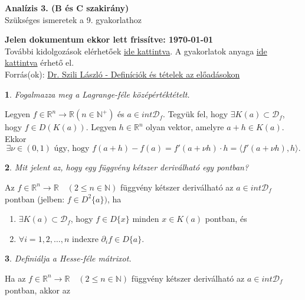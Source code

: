 \documentclass[a4paper]{article}
\def\R{\mathbb{R}}
\def\N{\mathbb{N}}
\theoremstyle{qstyle}
\newtheorem{question}{}{}
\begin{document}
	\begin{center}
		{\Large\textbf{Analízis 3. (B és C szakirány)}}\\
		{\Large Szükséges ismeretek a 9. gyakorlathoz}
	\end{center}
	
	\begin{framed}
		\textbf{Jelen dokumentum ekkor lett frissítve: {\yyyymmdddate\today} \ \currenttime}\\
		További kidolgozások elérhetőek \href{https://people.inf.elte.hu/totadavid95/Analizis3/2019-tavasz/}{ide kattintva}. A gyakorlatok anyaga \href{http://numanal.inf.elte.hu/~szili/Oktatas/An3_BC_szakirany_2019/An3_BC_gyak_2019_tavasz.pdf}{ide kattintva} érhető el.\\	
		Forrás(ok): \href{http://numanal.inf.elte.hu/~szili/Oktatas/An3_BC_szakirany_2019/An3_BC_ea_def_tetel_2019_tavasz.pdf}{Dr. Szili László - Definíciók és tételek az előadásokon}
	\end{framed}

	\begin{question}
		Fogalmazza meg a Lagrange-féle középértéktételt.
	\end{question}
	Legyen $f \in \R^n \to \R (n \in \N^+)$ és $a \in int\mathcal{D}_f$. Tegyük fel, hogy $\exists K(a) \subset \mathcal{D}_f$, hogy $f \in D(K(a))$. Legyen $h \in \R^n$ olyan vektor, amelyre $a+h \in K(a)$. Ekkor
	$$\exists \nu \in (0,1) \text{ úgy, hogy } f(a+h)-f(a)=f'(a+\nu h) \cdot h = \langle{f'(a+\nu h),h}\rangle \text{.}$$
	
	\begin{question}
		Mit jelent az, hogy egy függvény kétszer deriválható egy pontban?
	\end{question}
	Az $f \in \R^n \to \R \quad (2 \le n \in \N)$ függvény kétszer deriválható az $a \in int\mathcal{D}_f$ pontban (jelben: $f \in D^2\{a\})$, ha
	\vspace{-4mm}
	\begin{enumerate}
		\item $\exists K(a) \subset \mathcal{D}_f$, hogy $f \in D\{x\}$ minden $x \in K(a)$ pontban, és
		\item $\forall i = 1,2,\dots,n$ indexre $\partial_i f \in D\{a\}$.
	\end{enumerate}
	\vspace{-4mm}
	
	\begin{question}
		Definiálja a Hesse-féle mátrixot.
	\end{question}
	Ha az $f \in \R^n \to \R \quad (2 \le n \in \N)$ függvény kétszer deriválható az $a \in int\mathcal{D}_f$ pontban, akkor az
	
\end{document}
